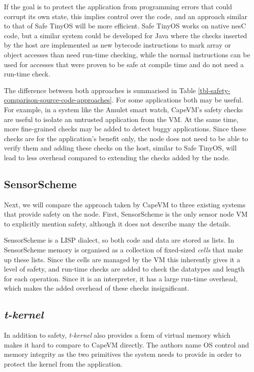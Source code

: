 If the goal is to protect the application from programming errors that could corrupt its own state, this implies control over the code, and an approach similar to that of Safe TinyOS will be more efficient. Safe TinyOS works on native nesC code, but a similar system could be developed for Java where the checks inserted by the host are implemented as new bytecode instructions to mark array or object accesses than need run-time checking, while the normal instructions can be used for accesses that were proven to be safe at compile time and do not need a run-time check.

The difference between both approaches is summarised in Table \ref{tbl-safety-comparison-source-code-approaches}. For some applications both may be useful. For example, in a system like the Amulet smart watch, CapeVM's safety checks are useful to isolate an untrusted application from the VM. At the same time, more fine-grained checks may be added to detect buggy applications. Since these checks are for the application's benefit only, the node does not need to be able to verify them and adding these checks on the host, similar to Safe TinyOS, will lead to less overhead compared to extending the checks added by the node.




\subsection{SensorScheme}
Next, we will compare the approach taken by CapeVM to three existing systems that provide safety on the node. First, SensorScheme is the only sensor node VM to explicitly mention safety, although it does not describe many the details.

SensorScheme is a LISP dialect, so both code and data are stored as lists. In SensorScheme memory is organised as a collection of fixed-sized \emph{cells} that make up these lists. Since the cells are managed by the VM this inherently gives it a level of safety, and run-time checks are added to check the datatypes and length for each operation. Since it is an interpreter, it has a large run-time overhead, which makes the added overhead of these checks insignificant.




\subsection{\emph{t-kernel}}
In addition to safety, \emph{t-kernel} \cite{Gu:2005un, Gu:2006ww} also provides a form of virtual memory which makes it hard to compare to CapeVM directly. The authors name OS control and memory integrity as the two primitives the system needs to provide in order to protect the kernel from the application.

